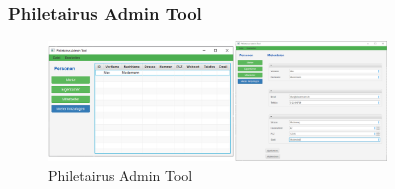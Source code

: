 \begin{frame}
\frametitle{Philetairus Admin Tool}

\begin{figure}
  \includegraphics[width=0.8\textwidth]{figures/phileadmin_workflow.png}
  \caption{Philetairus Admin Tool}
  \label{fig:phileadmin}
\end{figure}

\end{frame}




